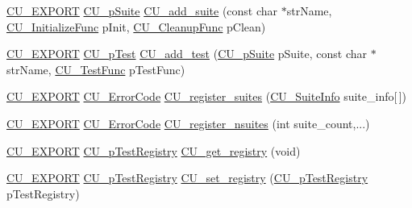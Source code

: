\begin{DoxyCompactItemize}
\item 
\hyperlink{group___framework_ga22e538403fdee24be3388ab473fe64d5}{C\+U\+\_\+\+E\+X\+P\+O\+R\+T} \hyperlink{group___framework_gaba832ae8b235f5e70d6a4ac9c3bb1219}{C\+U\+\_\+p\+Suite} \hyperlink{group___framework_ga94b8f1bbbd93b154a60bb1d43391b48a}{C\+U\+\_\+add\+\_\+suite} (const char $\ast$str\+Name, \hyperlink{group___framework_gaab4b8ad3aa3a3c222c43c8a330de11e3}{C\+U\+\_\+\+Initialize\+Func} p\+Init, \hyperlink{group___framework_ga90966c0bede742195897c3aeff4c342b}{C\+U\+\_\+\+Cleanup\+Func} p\+Clean)
\item 
\hyperlink{group___framework_ga22e538403fdee24be3388ab473fe64d5}{C\+U\+\_\+\+E\+X\+P\+O\+R\+T} \hyperlink{group___framework_ga249c43fbe4e53452b3f90db1437da04b}{C\+U\+\_\+p\+Test} \hyperlink{group___framework_gad9f198a8a5fa8cc6870c3c8be873869f}{C\+U\+\_\+add\+\_\+test} (\hyperlink{group___framework_gaba832ae8b235f5e70d6a4ac9c3bb1219}{C\+U\+\_\+p\+Suite} p\+Suite, const char $\ast$str\+Name, \hyperlink{group___framework_ga5868148b642b30635b8fe7f095c5b493}{C\+U\+\_\+\+Test\+Func} p\+Test\+Func)
\item 
\hyperlink{group___framework_ga22e538403fdee24be3388ab473fe64d5}{C\+U\+\_\+\+E\+X\+P\+O\+R\+T} \hyperlink{group___framework_ga743a2a025ee3eb792d7d85f0eea347e6}{C\+U\+\_\+\+Error\+Code} \hyperlink{group___framework_ga331001da0a8bd8faececdb48e7ad3f96}{C\+U\+\_\+register\+\_\+suites} (\hyperlink{struct_c_u___suite_info}{C\+U\+\_\+\+Suite\+Info} suite\+\_\+info\mbox{[}$\,$\mbox{]})
\item 
\hyperlink{group___framework_ga22e538403fdee24be3388ab473fe64d5}{C\+U\+\_\+\+E\+X\+P\+O\+R\+T} \hyperlink{group___framework_ga743a2a025ee3eb792d7d85f0eea347e6}{C\+U\+\_\+\+Error\+Code} \hyperlink{group___framework_gaef02c65058bfe9f3adc320d536428588}{C\+U\+\_\+register\+\_\+nsuites} (int suite\+\_\+count,...)
\item 
\hyperlink{group___framework_ga22e538403fdee24be3388ab473fe64d5}{C\+U\+\_\+\+E\+X\+P\+O\+R\+T} \hyperlink{group___framework_ga2a416821761e04581a70c41ae3587d5c}{C\+U\+\_\+p\+Test\+Registry} \hyperlink{group___framework_gacdc4bab7b0492ed1e3a4e076677de22e}{C\+U\+\_\+get\+\_\+registry} (void)
\item 
\hyperlink{group___framework_ga22e538403fdee24be3388ab473fe64d5}{C\+U\+\_\+\+E\+X\+P\+O\+R\+T} \hyperlink{group___framework_ga2a416821761e04581a70c41ae3587d5c}{C\+U\+\_\+p\+Test\+Registry} \hyperlink{group___framework_gaaec6d8893d61bfff165775385851562d}{C\+U\+\_\+set\+\_\+registry} (\hyperlink{group___framework_ga2a416821761e04581a70c41ae3587d5c}{C\+U\+\_\+p\+Test\+Registry} p\+Test\+Registry)

\end{DoxyCompactItemize}
